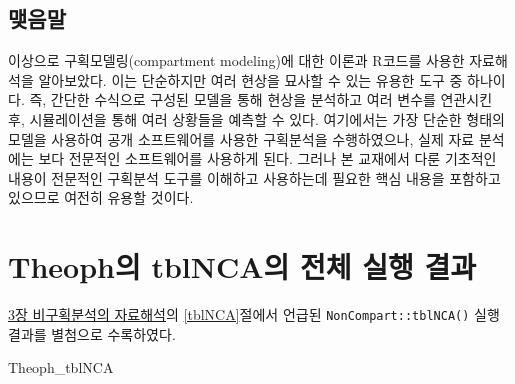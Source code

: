 \documentclass[
  11pt,
  krantz2, a4paper, twoside]{krantz}
\newenvironment{Shaded}{\begin{snugshade}}{\end{snugshade}}
\newcommand{\NormalTok}[1]{#1}
\theoremstyle{definition}
\theoremstyle{definition}
\theoremstyle{definition}
\theoremstyle{definition}
\theoremstyle{remark}
\begin{document}
\hypertarget{uxb9fauxc74cuxb9d0-4}{%
\section{맺음말}\label{uxb9fauxc74cuxb9d0-4}}

이상으로 구획모델링(compartment modeling)에 대한 이론과 R코드를 사용한 자료해석을 알아보았다. 
이는 단순하지만 여러 현상을 묘사할 수 있는 유용한 도구 중 하나이다.
즉, 간단한 수식으로 구성된 모델을 통해 현상을 분석하고 여러 변수를 연관시킨 후, 시뮬레이션을 통해 여러 상황들을 예측할 수 있다. 
여기에서는 가장 단순한 형태의 모델을 사용하여 공개 소프트웨어를 사용한 구획분석을 수행하였으나, 실제 자료 분석에는 보다 전문적인 소프트웨어를 사용하게 된다.
그러나 본 교재에서 다룬 기초적인 내용이 전문적인 구획분석 도구를 이해하고 사용하는데 필요한 핵심 내용을 포함하고 있으므로 여전히 유용할 것이다.

\cleardoublepage

\hypertarget{appendix-uxbcc4uxcca8}{%
\appendix {}}


\hypertarget{Theoph_tblNCA}{%
\chapter{Theoph의 tblNCA의 전체 실행 결과}\label{Theoph_tblNCA}}

\protect\hyperlink{nca-analysis}{3장 비구획분석의 자료해석}의 \ref{tblNCA}절에서 언급된 \texttt{NonCompart::tblNCA()} 실행결과를 별첨으로 수록하였다.

\tiny

\begin{Shaded}
\begin{Highlighting}[]
\NormalTok{Theoph\_tblNCA}
\end{Highlighting}
\end{Shaded}
\end{document}
